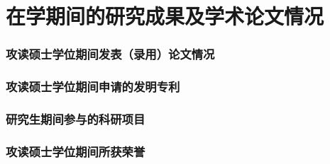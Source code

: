 \chapter{在学期间的研究成果及学术论文情况}


\subsection*{攻读硕士学位期间发表（录用）论文情况}


\subsection*{攻读硕士学位期间申请的发明专利}


\subsection*{研究生期间参与的科研项目}


\subsection*{攻读硕士学位期间所获荣誉}
